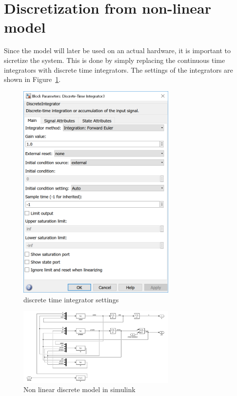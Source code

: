 \section{Discretization from non-linear model}
Since the model will later be used on an actual hardware, it is important to sicretize the system. This is done by simply replacing the continuous time integrators with discrete time integrators. The settings of the integrators are shown in Figure~\ref{fig:integrator}.	
\begin{figure}[H]
		\centering
		\includegraphics[width=0.7\textwidth]{figures/simulink_discrete_integrator.png}
		\caption{discrete time integrator settings}
		\label{fig:integrator}
\end{figure}	
\begin{figure}[H]
		\centering
		\includegraphics[width=0.7\textwidth]{figures/non_linear_discrete.png}
		\caption{Non linear discrete model in simulink}
		\label{fig:non_linear_continuous}
\end{figure}	

